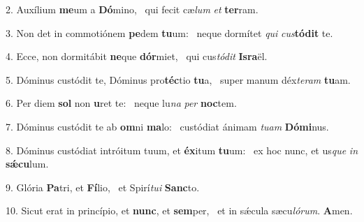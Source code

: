 2. Auxílium \textbf{me}um a \textbf{Dó}mino, \ast\  qui fecit cæ\textit{lum} \textit{et} \textbf{ter}ram.\

3. Non det in commotiónem \textbf{pe}dem \textbf{tu}um: \ast\  neque dormítet \textit{qui} \textit{cus}\textbf{tó}\textbf{dit} te.\

4. Ecce, non dormitábit \textbf{ne}que \textbf{dór}miet, \ast\  qui cus\textit{tó}\textit{dit} \textbf{Is}\textbf{ra}ël.\

5. Dóminus custódit te, Dóminus pro\textbf{téc}tio \textbf{tu}a, \ast\  super manum déx\textit{te}\textit{ram} \textbf{tu}am.\

6. Per diem \textbf{sol} non \textbf{u}ret te: \ast\  neque lu\textit{na} \textit{per} \textbf{noc}tem.\

7. Dóminus custódit te ab \textbf{om}ni \textbf{ma}lo: \ast\  custódiat ánimam \textit{tu}\textit{am} \textbf{Dó}\textbf{mi}nus.\

8. Dóminus custódiat intróitum tuum, et \textbf{éx}itum \textbf{tu}um: \ast\  ex hoc nunc, et us\textit{que} \textit{in} \textbf{sǽ}\textbf{cu}lum.\

9. Glória \textbf{Pa}tri, et \textbf{Fí}lio, \ast\  et Spirí\textit{tu}\textit{i} \textbf{Sanc}to.\

10. Sicut erat in princípio, et \textbf{nunc}, et \textbf{sem}per, \ast\  et in sǽcula sæcu\textit{ló}\textit{rum}. \textbf{A}men.\

